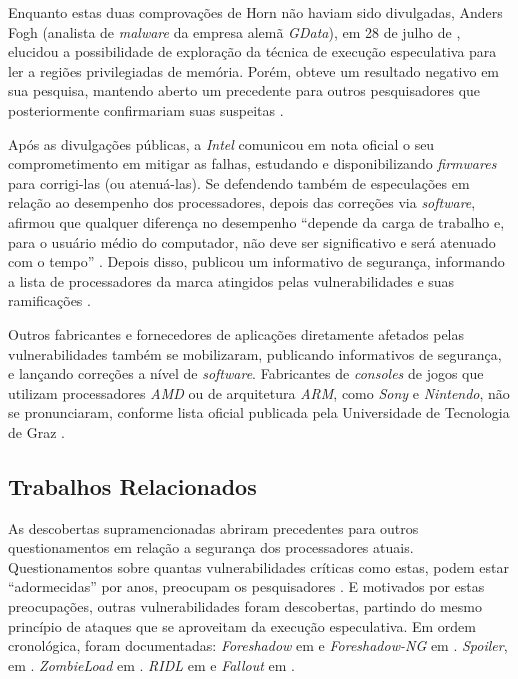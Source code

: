 \documentclass[
	article,			    %
	12pt,				    %
	oneside,			    %
	a4paper,			    %
	chapter=TITLE,		    %
	section=TITLE,		    %
	subsection=TITLE,	    %
	english,			    %
	brazil,				    %
	sumario=tradicional
]{abntex2}
\begin{document}
Enquanto estas duas comprovações de Horn não haviam sido divulgadas, Anders Fogh (analista de \emph{malware} da empresa alemã \emph{GData}), em 28 de julho de \citeyear{Anders2017Reading}, elucidou a possibilidade de exploração da técnica de execução especulativa para ler a regiões privilegiadas de memória. Porém, obteve um resultado negativo em sua pesquisa, mantendo aberto um precedente para outros pesquisadores que posteriormente confirmariam suas suspeitas \cite{Andy2018Triple}.

Após as divulgações públicas, a \emph{Intel} comunicou em nota oficial o seu comprometimento em mitigar as falhas, estudando e disponibilizando \emph{firmwares} para corrigi-las (ou atenuá-las). Se defendendo também de especulações em relação ao desempenho dos processadores, depois das correções via \emph{software}, afirmou que qualquer diferença no desempenho ``depende da carga de trabalho e, para o usuário médio do computador, não deve ser significativo e será atenuado com o tempo'' \cite{Intel2018NewsIssues}. Depois disso, publicou um informativo de segurança, informando a lista de processadores da marca atingidos pelas vulnerabilidades e suas ramificações \cite{Intel2018SA00088}.

Outros fabricantes e fornecedores de aplicações diretamente afetados pelas vulnerabilidades também se mobilizaram, publicando informativos de segurança, e lançando correções a nível de \emph{software}. Fabricantes de \emph{consoles} de jogos que utilizam processadores \emph{AMD} ou de arquitetura \emph{ARM}, como \emph{Sony} e \emph{Nintendo}, não se pronunciaram, conforme lista oficial publicada pela Universidade de Tecnologia de Graz \cite{Graz2018Meltdown}.

\subsection{Trabalhos Relacionados}
As descobertas supramencionadas abriram precedentes para outros questionamentos em relação a segurança dos processadores atuais. Questionamentos sobre quantas vulnerabilidades críticas como estas, podem estar ``adormecidas'' por anos, preocupam os pesquisadores \cite{Andy2018Triple}. E motivados por estas preocupações, outras vulnerabilidades foram descobertas, partindo do mesmo princípio de ataques que se aproveitam da execução especulativa. Em ordem cronológica, foram documentadas: \emph{Foreshadow} em  e \emph{Foreshadow-NG} em . \emph{Spoiler}, em . \emph{ZombieLoad} em . \emph{RIDL} em  e \emph{Fallout} em .
\end{document}
